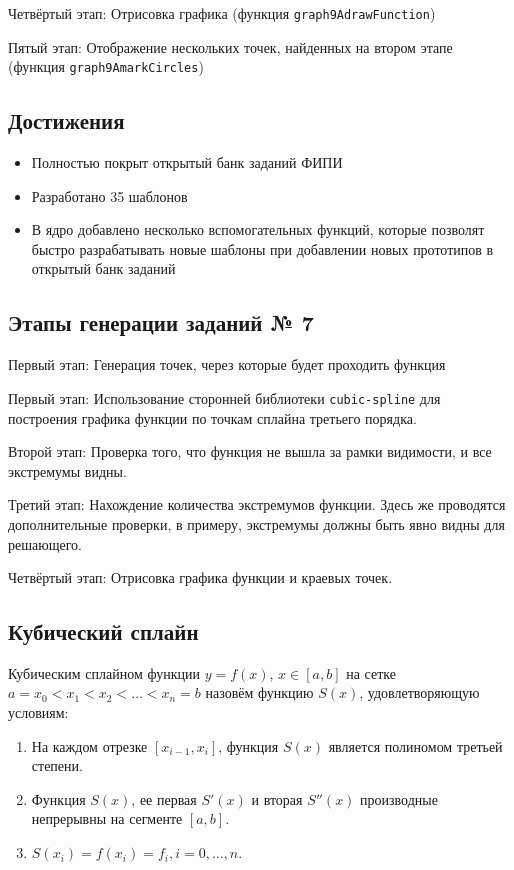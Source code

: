 \documentclass[a4paper, 12pt]{extarticle}
\begin{document}
Четвёртый этап: Отрисовка графика (функция \texttt{graph9AdrawFunction})

Пятый этап: Отображение нескольких точек, найденных на втором этапе (функция \texttt{graph9AmarkCircles})

\subsection*{Достижения}
\begin{itemize}
    \item Полностью покрыт открытый банк заданий ФИПИ
    \item Разработано 35 шаблонов
    \item В ядро добавлено несколько вспомогательных функций, которые позволят быстро разрабатывать новые шаблоны при добавлении новых прототипов в открытый банк заданий
\end{itemize}

\subsection*{Этапы генерации заданий № 7}
    Первый этап: Генерация точек, через которые будет проходить функция
        
    Первый этап: Использование сторонней библиотеки \texttt{cubic-spline} для построения графика функции по точкам сплайна третьего порядка.
        
    Второй этап: Проверка того, что функция не вышла за рамки видимости, и все экстремумы видны. %
    
    Третий этап: Нахождение количества экстремумов функции.
    Здесь же проводятся дополнительные проверки, в примеру, экстремумы должны быть явно видны для решающего. 
        
    Четвёртый этап: Отрисовка графика функции и краевых точек.
    
\subsection*{Кубический сплайн}

Кубическим сплайном функции $y = f(x)$, $x\in[a, b]$ на сетке $a=x_0<x_1<x_2< \dots <x_n=b$ назовём функцию $S(x)$, удовлетворяющую условиям:
    \begin{enumerate}
        \item На каждом отрезке $[x_{i-1},x_i]$, функция $S(x)$ является полиномом третьей степени.
        \item Функция $S(x)$, ее первая $S'(x)$ и вторая $S''(x)$ производные непрерывны на сегменте $[a, b]$.
        \item $S(x_i)=f(x_i)=f_i, i=0,\dots,n$.
\end{enumerate}
\end{document}

